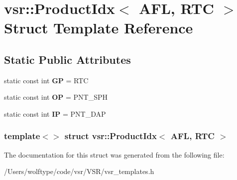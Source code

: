 \hypertarget{structvsr_1_1_product_idx_3_01_a_f_l_00_01_r_t_c_01_4}{\section{vsr\-:\-:Product\-Idx$<$ A\-F\-L, R\-T\-C $>$ Struct Template Reference}
\label{structvsr_1_1_product_idx_3_01_a_f_l_00_01_r_t_c_01_4}
}
\subsection*{Static Public Attributes}
\begin{DoxyCompactItemize}
\item 
\hypertarget{structvsr_1_1_product_idx_3_01_a_f_l_00_01_r_t_c_01_4_a6c73e7c0b73215cbc8c84718cbd315e1}{static const int {\bfseries G\-P} = R\-T\-C}\label{structvsr_1_1_product_idx_3_01_a_f_l_00_01_r_t_c_01_4_a6c73e7c0b73215cbc8c84718cbd315e1}

\item 
\hypertarget{structvsr_1_1_product_idx_3_01_a_f_l_00_01_r_t_c_01_4_a78098e65299be16797ef1069eced560b}{static const int {\bfseries O\-P} = P\-N\-T\-\_\-\-S\-P\-H}\label{structvsr_1_1_product_idx_3_01_a_f_l_00_01_r_t_c_01_4_a78098e65299be16797ef1069eced560b}

\item 
\hypertarget{structvsr_1_1_product_idx_3_01_a_f_l_00_01_r_t_c_01_4_ac389bde2c71540764e3d16d31adc4358}{static const int {\bfseries I\-P} = P\-N\-T\-\_\-\-D\-A\-P}\label{structvsr_1_1_product_idx_3_01_a_f_l_00_01_r_t_c_01_4_ac389bde2c71540764e3d16d31adc4358}

\end{DoxyCompactItemize}
\subsubsection*{template$<$$>$ struct vsr\-::\-Product\-Idx$<$ A\-F\-L, R\-T\-C $>$}



The documentation for this struct was generated from the following file\-:\begin{DoxyCompactItemize}
\item 
/\-Users/wolftype/code/vsr/\-V\-S\-R/vsr\-\_\-templates.\-h\end{DoxyCompactItemize}

